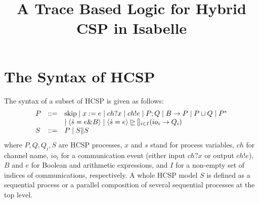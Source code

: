 \documentclass{llncs}
\begin{document}
\mainmatter

\title{A Trace Based Logic for Hybrid CSP in Isabelle}
\author{ }
\institute{ }


\maketitle

 \section{The Syntax of HCSP}
 
 The syntax of a subset of HCSP is given as follows:
\[
\begin{array}{lll}
 P  & ::= & \textmd{skip} \mid x :=e  \mid ch?x \mid ch!e  \mid P;Q  \mid B \rightarrow P\mid  P \sqcup Q \mid P^*\\
      && \mid \langle \dot{s}=e\& B\rangle \mid \langle \dot{s}=e\rangle \unrhd \talloblong_{i\in I} (io_i \rightarrow Q_i)\\
 S &::=& P \mid S\|S
  \end{array}
 \]
where $P, Q, Q_i, S$ are HCSP processes, $x$ and $s$ stand for process variables,
 $ch$ for channel name, $io_i$ for a communication event (either input $ch?x$ or output  $ch!e$),
$B$ and $e$ for Boolean and arithmetic expressions,
 and $I$ for a non-empty set of indices of communications, respectively.
 A whole HCSP model $S$ is defined
 as a sequential process or a parallel composition of several sequential processes at the top level.
\end{document}
